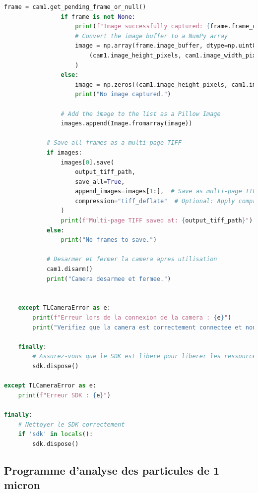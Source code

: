 \documentclass[11pt,letterpaper]{article}
\begin{document}
\begin{lstlisting}[language=python]
                frame = cam1.get_pending_frame_or_null()
                if frame is not None:
                    print(f"Image successfully captured: {frame.frame_count}")
                    # Convert the image buffer to a NumPy array
                    image = np.array(frame.image_buffer, dtype=np.uint8).reshape(
                        (cam1.image_height_pixels, cam1.image_width_pixels)
                    )
                else:
                    image = np.zeros((cam1.image_height_pixels, cam1.image_width_pixels), dtype=np.uint8)
                    print("No image captured.")

                # Add the image to the list as a Pillow Image
                images.append(Image.fromarray(image))

            # Save all frames as a multi-page TIFF
            if images:
                images[0].save(
                    output_tiff_path,
                    save_all=True,
                    append_images=images[1:],  # Save as multi-page TIFF
                    compression="tiff_deflate"  # Optional: Apply compression
                )
                print(f"Multi-page TIFF saved at: {output_tiff_path}")
            else:
                print("No frames to save.")

            # Desarmer et fermer la camera apres utilisation
            cam1.disarm()
            print("Camera desarmee et fermee.")


    except TLCameraError as e:
        print(f"Erreur lors de la connexion de la camera : {e}")
        print("Verifiez que la camera est correctement connectee et non utilisee par un autre programme.")

    finally:
        # Assurez-vous que le SDK est libere pour liberer les ressources
        sdk.dispose()

except TLCameraError as e:
    print(f"Erreur SDK : {e}")

finally:
    # Nettoyer le SDK correctement
    if 'sdk' in locals():
        sdk.dispose()
\end{lstlisting}

\subsection{Programme d'analyse des particules de 1 micron}
\end{document}
